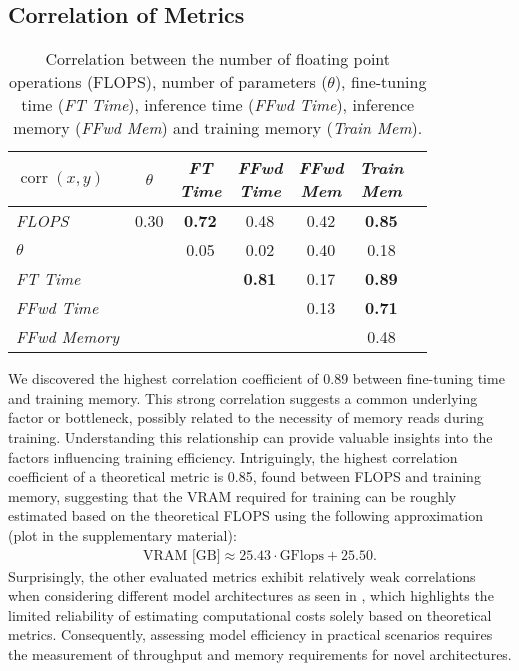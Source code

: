 \subsection{Correlation of Metrics}
\begin{table}
	\centering
	\begin{tabular}{l|cccccc}
		$\operatorname{corr}(x, y)$      & $\theta$ & \makecell[c]{\textit{FT} \\ \textit{Time}} & \makecell[c]{\textit{FFwd} \\ \textit{Time}} & \makecell[c]{\textit{FFwd} \\ \textit{Mem}} & \makecell[c]{\textit{Train} \\ \textit{Mem}} \\
		\hline
		\textit{FLOPS}				& 0.30 & \textbf{0.72} & 0.48          & 0.42 & \textbf{0.85} \\
		\textit{$\theta$}           &      & 0.05          & 0.02          & 0.40 & 0.18          \\
		\textit{FT Time}            &      &               & \textbf{0.81} & 0.17 & \textbf{0.89} \\
		\textit{FFwd Time}     		&      &               &               & 0.13 & \textbf{0.71} \\
		\textit{FFwd Memory}       	&      &               &               &      & 0.48          \\
	\end{tabular}
	\caption{Correlation between the number of floating point operations (FLOPS), number of parameters ($\theta$), fine-tuning time (\textit{FT Time}), inference time (\textit{FFwd Time}), inference memory (\textit{FFwd Mem}) and training memory (\textit{Train Mem}).}
	\label{table:correlation_of_metrics}
\end{table}


We discovered the highest correlation coefficient of 0.89 between fine-tuning time and training memory. This strong correlation suggests a common underlying factor or bottleneck, possibly related to the necessity of memory reads during training. 
Understanding this relationship can provide valuable insights into the factors influencing training efficiency.
Intriguingly, the highest correlation coefficient of a theoretical metric is 0.85, found between FLOPS and training memory, suggesting that the VRAM required for training can be roughly estimated based on the theoretical FLOPS using the following approximation (plot in the supplementary material):
\begin{align*}
	\text{VRAM [GB]} \approx 25.43 \cdot \text{GFlops} + 25.50.
\end{align*}
Surprisingly, the other evaluated metrics 
exhibit relatively weak correlations when considering different model architectures as seen in , which highlights the limited reliability of estimating computational costs solely based on theoretical metrics. 
Consequently, assessing model efficiency in practical scenarios requires the measurement of throughput and memory requirements for novel architectures.

